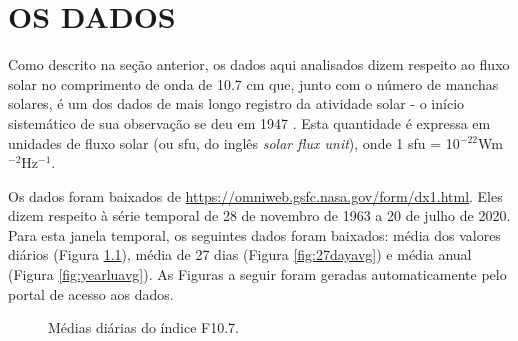 
\chapter{OS DADOS}

Como descrito na seção anterior, os dados aqui analisados dizem respeito ao fluxo solar no comprimento de onda de 10.7 cm que, junto com o número de manchas solares, é um dos dados de mais longo registro da atividade solar - o início sistemático de sua observação se deu em 1947 \cite{tapping201310}. Esta quantidade é expressa em unidades de fluxo solar (ou sfu, do inglês \textit{solar flux unit}), onde 1 sfu = 10$^{-22}$Wm$^{-2}$Hz$^{-1}$.

Os dados foram baixados de \url{https://omniweb.gsfc.nasa.gov/form/dx1.html}. Eles dizem respeito à série temporal de 28 de novembro de 1963 a 20 de julho de 2020. Para esta janela temporal, os seguintes dados foram baixados: média dos valores diários (Figura \ref{fig:dailyavg}), média de 27 dias (Figura \ref{fig:27dayavg}) e média anual (Figura \ref{fig:yearluavg}). As Figuras a seguir foram geradas automaticamente pelo portal de acesso aos dados.

\begin{figure}[ht!]
	\caption{Médias diárias do índice F10.7.}
	\vspace{0mm}	%
	\begin{center}
	\end{center}
	\vspace{-2mm}	%
	\label{fig:dailyavg}
\end{figure}


